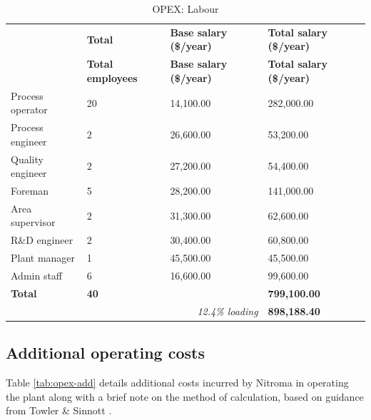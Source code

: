 \begin{table}[H]
\centering
\caption{OPEX: Labour}
\label{tab:opex-labour}
\begin{tabular}{llll}
\toprule
\textbf{}        & \textbf{Total} & \textbf{Base salary (\$/year)}              & \textbf{Total salary (\$/year)} \\
\textbf{}        & \textbf{Total employees} & \textbf{Base salary (\$/year)}              & \textbf{Total salary (\$/year)} \\\midrule
Process operator & 20                       & 14,100.00                                   & 282,000.00                      \\
Process engineer & 2                        & 26,600.00                                   & 53,200.00                       \\
Quality engineer & 2                        & 27,200.00                                   & 54,400.00                       \\
Foreman          & 5                        & 28,200.00                                   & 141,000.00                      \\
Area supervisor  & 2                        & 31,300.00                                   & 62,600.00                       \\
R\&D engineer    & 2                        & 30,400.00                                   & 60,800.00                       \\
Plant manager    & 1                        & 45,500.00                                   & 45,500.00                       \\
Admin staff      & 6                        & 16,600.00                                   & 99,600.00                       \\
\textbf{Total}   & \textbf{40}              & \textbf{}                                   & \textbf{799,100.00}             \\
                 &                          & \multicolumn{1}{r}{\textit{12.4\% loading}} & \textbf{898,188.40} \\\bottomrule           
\end{tabular}
\end{table}

\subsection{Additional operating costs}
Table \ref{tab:opex-add} details additional costs incurred by Nitroma in operating the plant along with a brief note on the method of calculation, based on guidance from Towler \& Sinnott \cite{sinnott_chemical_2020}.

